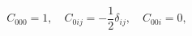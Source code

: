 \begin{equation}\label{canbasis}
C_{000}=1,\quad C_{0ij}=-\frac{1}{2}\delta_{ij},\quad  C_{00i}=0,
\end{equation}

